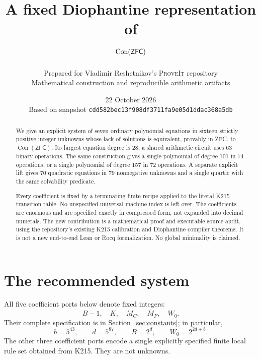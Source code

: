 \documentclass[11pt,a4paper]{article}
\title{A fixed Diophantine representation of\texorpdfstring{\\$\Con(\ZFC)$}{ Con(ZFC)}}
\author{Prepared for Vladimir Reshetnikov's \textsc{ProveIt} repository\\\small Mathematical construction and reproducible arithmetic artifacts}
\date{22 October 2026\\\small Based on snapshot \texttt{cdd582bec13f908df3711fa9e05d1ddac368a5db}}
\theoremstyle{definition}\newtheorem{definition}[theorem]{Definition}
\newcommand{\ZFC}{\mathsf{ZFC}}
\newcommand{\Con}{\operatorname{Con}}
\newcommand{\MF}{\overline M_F}
\begin{document}
\maketitle
\begin{abstract}
We give an explicit system of seven ordinary polynomial equations in sixteen
strictly positive integer unknowns whose lack of solutions is equivalent,
provably in ZFC, to $\Con(\ZFC)$. Its largest equation degree is 28; a shared
arithmetic circuit uses 63 binary operations. The same construction gives
a single polynomial of degree 101 in 74 operations, or a single polynomial
of degree 157 in 72 operations. A separate explicit lift gives 70 quadratic
equations in 79 nonnegative unknowns and a single quartic with the same
solvability predicate.

Every coefficient is fixed by a terminating finite recipe applied to the
literal K215 transition table. No unspecified universal-machine index is
left over. The coefficients are enormous and are specified exactly in
compressed form, not expanded into decimal numerals. The new contribution
is a mathematical proof and executable source audit, using the repository's
existing K215 calibration and Diophantine compiler theorems. It is not a
new end-to-end Lean or Rocq formalization. No global minimality is claimed.
\end{abstract}

\tableofcontents
\newpage

\section{The recommended system}
\label{sec:system}

All five coefficient ports below denote fixed integers:
\[
 B-1,\quad K,\quad M_C,\quad \MF,\quad W_0.
\]
Their complete specification is in Section~\ref{sec:constants}; in
particular,
\begin{equation}\label{eq:visibleconstants}
 b=5^{43},\qquad d=5^{87},\qquad B=2^d,\qquad
 W_0=2^{2d+b}.
\end{equation}
The other three coefficient ports encode a single explicitly specified
finite local rule set obtained from K215. They are not unknowns.
\end{document}
